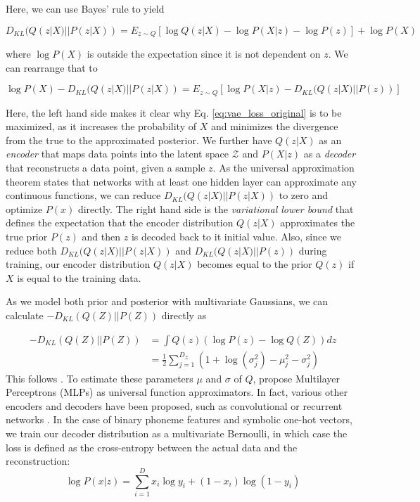 \documentclass[6pt]{article}
\begin{document}
Here, we can use Bayes' rule to yield 

\begin{equation}
D_{KL}(Q(z|X)||P(z|X)) = E_{z\sim Q}[\log Q(z|X) - \log P(X|z)-\log P(z)] + \log P(X)
\end{equation}

where $\log P(X)$ is outside the expectation since it is not dependent on $z$. We can rearrange that to 

\begin{equation}
\label{eq:vae_loss_original}
\log P(X) - D_{KL}(Q(z|X)||P(z|X)) = E_{z\sim Q}[\log P(X|z) - D_{KL}(Q(z|X)||P(z))] 
\end{equation}



Here, the left hand side makes it clear why Eq. \ref{eq:vae_loss_original} is to be maximized, as it increases the probability of $X$ and minimizes the divergence from the true to the approximated posterior. We further have $Q(z|X)$ as an \textit{encoder} that maps data points into the latent space $\mathcal{Z}$ and $P(X|z)$ as a \textit{decoder} that reconstructs a data point, given a sample $z$. As the universal approximation theorem states that networks with at least one hidden layer can approximate any continuous functions, we can reduce $D_{KL}(Q(z|X)||P(z|X))$ to zero and optimize $P(x)$ directly. The right hand side is the \textit{variational lower bound} that defines the expectation that the encoder distribution $Q(z|X)$ approximates the true prior $P(z)$ and then $z$ is decoded back to it initial value. Also, since we reduce both $D_{KL}(Q(z|X)||P(z|X))$ and $D_{KL}(Q(z|X)||P(z))$ during training, our encoder distribution $Q(z|X)$ becomes equal to the prior $Q(z)$  if $X$ is equal to the training data.

As we model both prior and posterior with multivariate Gaussians, we can calculate $-D_{KL}(Q(Z)||P(Z))$ directly as

\begin{equation}
\begin{split}
-D_{KL}(Q(Z)||P(Z)) & = \int Q(z) (\log P(z) - \log Q(Z)) dz\\
& = \frac{1}{2}\sum_{j=1}^{D_{\mathcal{Z}}}(1+\log(\sigma_j^2)-\mu_j^2-\sigma_j^2)
\end{split}
\end{equation}
This follows \cite[p. 10-11]{kingma2013auto}.
To estimate these parameters $\mu$ and $\sigma$ of $Q$,  \cite{kingma2013auto} propose Multilayer Perceptrons (MLPs) as universal function approximators. In fact, various other encoders and decoders have been proposed, such as convolutional or recurrent networks \citep{kulkarni2015deep,bowman2015generating,fabius2014variational}. 
In the case of binary phoneme features and symbolic one-hot vectors, we train our decoder distribution as a multivariate Bernoulli, in which case the loss is defined as the cross-entropy between the actual data and the reconstruction:
\begin{equation}
\log P(x|z) = \sum_{i=1}^{D} x_i \log y_i + (1-x_i) \log (1-y_i)
\label{eq:multivariate_bernoulli_prob}
\end{equation}
\end{document}
